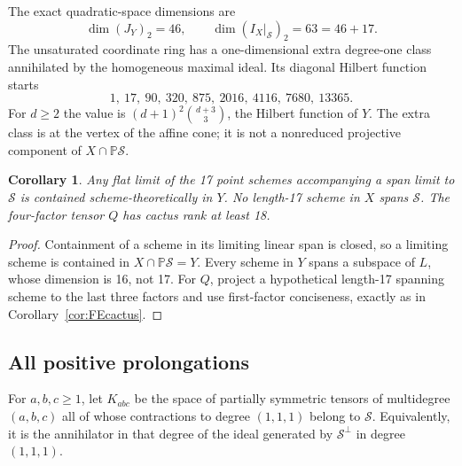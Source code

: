 \documentclass[11pt]{article}
\newtheorem{corollary}[theorem]{Corollary}
\theoremstyle{definition}\newtheorem{definition}[theorem]{Definition}
\theoremstyle{remark}\newtheorem{remark}[theorem]{Remark}
\newcommand{\PP}{\mathbb P}
\newcommand{\calS}{\mathcal S}
\begin{document}
The exact quadratic-space dimensions are
\[
 \dim (J_Y)_2=46,\qquad
 \dim (I_X|_{\calS})_2=63=46+17.
\]
The unsaturated coordinate ring has a one-dimensional extra degree-one class
annihilated by the homogeneous maximal ideal. Its diagonal Hilbert function
starts
\[
 1,\ 17,\ 90,\ 320,\ 875,\ 2016,\ 4116,\ 7680,\ 13365.
\]
For $d\geq2$ the value is $(d+1)^2\binom{d+3}{3}$, the Hilbert function of $Y$.
The extra class is at the vertex of the affine cone; it is not a nonreduced
projective component of $X\cap\PP\calS$.

\begin{corollary}\label{cor:schemelimit}
Any flat limit of the 17 point schemes accompanying a span limit to $\calS$
is contained scheme-theoretically in $Y$. No length-17 scheme in $X$ spans
$\calS$. The four-factor tensor $Q$ has cactus rank at least 18.
\end{corollary}
\begin{proof}
Containment of a scheme in its limiting linear span is closed, so a limiting
scheme is contained in $X\cap\PP\calS=Y$. Every scheme in $Y$ spans a subspace
of $L$, whose dimension is 16, not 17. For $Q$, project a hypothetical
length-17 spanning scheme to the last three factors and use first-factor
conciseness, exactly as in Corollary~\ref{cor:FEcactus}.
\end{proof}

\subsection{All positive prolongations}

For $a,b,c\geq1$, let $K_{abc}$ be the space of partially symmetric tensors of
multidegree $(a,b,c)$ all of whose contractions to degree $(1,1,1)$ belong to
$\calS$. Equivalently, it is the annihilator in that degree of the ideal
generated by $\calS^\perp$ in degree $(1,1,1)$.
\end{document}
